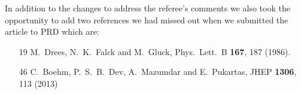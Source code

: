 \documentclass[12pt]{article}
\begin{document}
In addition to the changes to address the referee's comments we also took the
opportunity to add two references we had missed out when we submitted the
article to PRD which are:
\begin{itemize}
\item [19]  M.~Drees, N.~K.~Falck and M.~Gluck, Phys.\ Lett.\ B {\bf 167},
187 (1986).
\item [46]  C.~Boehm, P.~S.~B.~Dev, A.~Mazumdar and E.~Pukartas, JHEP
{\bf 1306}, 113 (2013)
\end{itemize}
\end{document}
